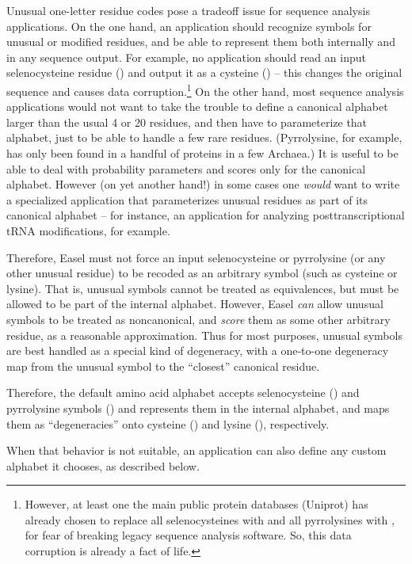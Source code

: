 Unusual one-letter residue codes pose a tradeoff issue for sequence
analysis applications. On the one hand, an application should
recognize symbols for unusual or modified residues, and be able to
represent them both internally and in any sequence output. For
example, no application should read an input selenocysteine residue
() and output it as a cysteine () -- this changes
the original sequence and causes data corruption.\footnote{However, at
least one the main public protein databases (Uniprot) has already
chosen to replace all selenocysteines with  and all
pyrrolysines with , for fear of breaking legacy sequence
analysis software.  So, this data corruption is already a fact of
life.}  On the other hand, most sequence analysis applications would
not want to take the trouble to define a canonical alphabet larger
than the usual 4 or 20 residues, and then have to parameterize that
alphabet, just to be able to handle a few rare residues. (Pyrrolysine,
for example, has only been found in a handful of proteins in a few
Archaea.) It is useful to be able to deal with probability parameters
and scores only for the canonical alphabet. However (on yet another
hand!) in some cases one \emph{would} want to write a specialized
application that parameterizes unusual residues as part of its
canonical alphabet -- for instance, an application for analyzing
posttranscriptional tRNA modifications, for example.

Therefore, Easel must not force an input selenocysteine or pyrrolysine
(or any other unusual residue) to be recoded as an arbitrary symbol
(such as cysteine or lysine). That is, unusual symbols cannot be
treated as equivalences, but must be allowed to be part of the
internal alphabet.  However, Easel \emph{can} allow unusual symbols to
be treated as noncanonical, and \emph{score} them as some other
arbitrary residue, as a reasonable approximation. Thus for most
purposes, unusual symbols are best handled as a special kind of
degeneracy, with a one-to-one degeneracy map from the unusual symbol
to the ``closest'' canonical residue.

Therefore, the default amino acid alphabet accepts selenocysteine
() and pyrrolysine symbols () and represents them in
the internal alphabet, and maps them as ``degeneracies'' onto cysteine
() and lysine (), respectively.

When that behavior is not suitable, an application can also define any
custom alphabet it chooses, as described below.


